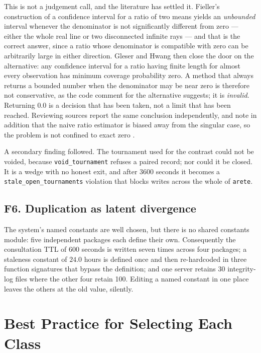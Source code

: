 \documentclass[10pt,twocolumn,letterpaper]{article}
\newcommand{\code}[1]{\texttt{#1}}
\begin{document}
This is not a judgement call, and the literature has settled it. Fieller's construction of a
confidence interval for a ratio of two means yields an \emph{unbounded} interval whenever the
denominator is not significantly different from zero \cite{fieller1954} --- either the whole real
line or two disconnected infinite rays --- and that is the correct answer, since a ratio whose
denominator is compatible with zero can be arbitrarily large in either direction. Gleser and Hwang
\cite{gleser1987} then close the door on the alternative: any confidence interval for a ratio
having finite length for almost every observation has minimum coverage probability zero. A method
that always returns a bounded number when the denominator may be near zero is therefore not
conservative, as the code comment for the alternative suggests; it is \emph{invalid}. Returning
$0.0$ is a decision that has been taken, not a limit that has been reached. Reviewing sources
report the same conclusion independently, and note in addition that the naive ratio estimator is
biased away from the singular case, so the problem is not confined to exact zero
\cite{axioms2025,fiellerguide}.

A secondary finding followed. The tournament used for the contrast could not be voided, because
\code{void\_tournament} refuses a paired record; nor could it be closed. It is a wedge with no
honest exit, and after 3600 seconds it becomes a \code{stale\_open\_tournaments} violation that
blocks writes across the whole of \code{arete}.

\subsection{F6. Duplication as latent divergence}
\label{sec:f6}

The system's named constants are well chosen, but there is no shared constants module: five
independent packages each define their own. Consequently the consultation TTL of 600 seconds is
written seven times across four packages; a staleness constant of $24.0$ hours is defined once and
then re-hardcoded in three function signatures that bypass the definition; and one server retains
30 integrity-log files where the other four retain 100. Editing a named constant in one place
leaves the others at the old value, silently.

\section{Best Practice for Selecting Each Class}
\label{sec:bestpractice}
\end{document}
